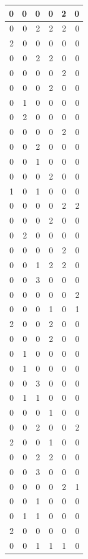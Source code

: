 \documentclass[
]{article}
\begin{document}
\begin{tabular}{r|r|r|r|r|r}
\hline
0 & 0 & 0 & 0 & 2 & 0\\
\hline
0 & 0 & 2 & 2 & 2 & 0\\
\hline
2 & 0 & 0 & 0 & 0 & 0\\
\hline
0 & 0 & 2 & 2 & 0 & 0\\
\hline
0 & 0 & 0 & 0 & 2 & 0\\
\hline
0 & 0 & 0 & 2 & 0 & 0\\
\hline
0 & 1 & 0 & 0 & 0 & 0\\
\hline
0 & 2 & 0 & 0 & 0 & 0\\
\hline
0 & 0 & 0 & 0 & 2 & 0\\
\hline
0 & 0 & 2 & 0 & 0 & 0\\
\hline
0 & 0 & 1 & 0 & 0 & 0\\
\hline
0 & 0 & 0 & 2 & 0 & 0\\
\hline
1 & 0 & 1 & 0 & 0 & 0\\
\hline
0 & 0 & 0 & 0 & 2 & 2\\
\hline
0 & 0 & 0 & 2 & 0 & 0\\
\hline
0 & 2 & 0 & 0 & 0 & 0\\
\hline
0 & 0 & 0 & 0 & 2 & 0\\
\hline
0 & 0 & 1 & 2 & 2 & 0\\
\hline
0 & 0 & 3 & 0 & 0 & 0\\
\hline
0 & 0 & 0 & 0 & 0 & 2\\
\hline
0 & 0 & 0 & 1 & 0 & 1\\
\hline
2 & 0 & 0 & 2 & 0 & 0\\
\hline
0 & 0 & 0 & 2 & 0 & 0\\
\hline
0 & 1 & 0 & 0 & 0 & 0\\
\hline
0 & 1 & 0 & 0 & 0 & 0\\
\hline
0 & 0 & 3 & 0 & 0 & 0\\
\hline
0 & 1 & 1 & 0 & 0 & 0\\
\hline
0 & 0 & 0 & 1 & 0 & 0\\
\hline
0 & 0 & 2 & 0 & 0 & 2\\
\hline
2 & 0 & 0 & 1 & 0 & 0\\
\hline
0 & 0 & 2 & 2 & 0 & 0\\
\hline
0 & 0 & 3 & 0 & 0 & 0\\
\hline
0 & 0 & 0 & 0 & 2 & 1\\
\hline
0 & 0 & 1 & 0 & 0 & 0\\
\hline
0 & 1 & 1 & 0 & 0 & 0\\
\hline
2 & 0 & 0 & 0 & 0 & 0\\
\hline
0 & 0 & 1 & 1 & 1 & 0\\

\end{tabular}
\end{document}
